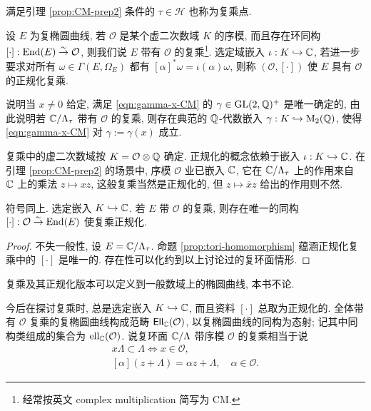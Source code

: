 满足引理 \ref{prop:CM-prep2} 条件的 $\tau \in \mathcal{H}$ 也称为复乘点. 

\begin{definition}[复乘]
	设 $E$ 为复椭圆曲线, 若 $\mathcal{O}$ 是某个虚二次数域 $K$ 的序模, 而且存在环同构 $[\cdot]: \operatorname{End}(E) \stackrel{\sim}{\rightarrow} \mathcal{O}$, 则我们说 $E$ 带有 $\mathcal{O}$ 的复乘\footnote{经常按英文 complex multiplication 简写为 CM.}. 选定域嵌入 $\iota: K \hookrightarrow \mathbb{C}$, 若进一步要求对所有 $\omega \in \Gamma(E, \Omega_E)$ 都有 $[\alpha]^* \omega = \iota(\alpha) \omega$, 则称 $(\mathcal{O}, [\cdot])$ 使 $E$ 具有 $\mathcal{O}$ 的正规化复乘.
\end{definition}

\begin{exercise}
	说明当 $x \neq 0$ 给定, 满足 \eqref{eqn:gamma-x-CM} 的 $\gamma \in \operatorname{GL}(2, \mathbb{Q})^+$ 是唯一确定的, 由此说明若 $\mathbb{C}/\Lambda_\tau$ 带有 $\mathcal{O}$ 的复乘, 则存在典范的 $\mathbb{Q}$-代数嵌入 $\gamma: K \hookrightarrow \operatorname{M}_2(\mathbb{Q})$, 使得 \eqref{eqn:gamma-x-CM} 对 $\gamma := \gamma(x)$ 成立.
\end{exercise}

复乘中的虚二次数域按 $K = \mathcal{O} \otimes \mathbb{Q}$ 确定. 正规化的概念依赖于嵌入 $\iota: K \hookrightarrow \mathbb{C}$. 在引理 \ref{prop:CM-prep2} 的场景中, 序模 $\mathcal{O}$ 业已嵌入 $\mathbb{C}$, 它在 $\mathbb{C}/\Lambda_\tau$ 上的作用来自 $\mathbb{C}$ 上的乘法 $z \mapsto xz$, 这般复乘当然是正规化的, 但 $z \mapsto \overline{x} z$ 给出的作用则不然. 

\begin{lemma}
	符号同上. 选定嵌入 $K \hookrightarrow \mathbb{C}$. 若 $E$ 带 $\mathcal{O}$ 的复乘, 则存在唯一的同构 $[\cdot]: \mathcal{O} \stackrel{\sim}{\rightarrow} \operatorname{End}(E)$ 使复乘正规化.
\end{lemma}
\begin{proof}
	不失一般性, 设 $E = \mathbb{C}/\Lambda_\tau$. 命题 \ref{prop:tori-homomorphism} 蕴涵正规化复乘中的 $[\cdot]$ 是唯一的. 存在性可以化约到以上讨论过的复环面情形.
\end{proof}

复乘及其正规化版本可以定义到一般数域上的椭圆曲线, 本书不论.

今后在探讨复乘时, 总是选定嵌入 $K \hookrightarrow \mathbb{C}$, 而且资料 $[\cdot]$ 总取为正规化的. 全体带有 $\mathcal{O}$ 复乘的复椭圆曲线构成范畴 $\mathsf{Ell}_{\mathbb{C}}(\mathcal{O})$, 以复椭圆曲线的同构为态射; 记其中同构类组成的集合为 $\mathrm{ell}_{\mathbb{C}}(\mathcal{O})$. 说复环面 $\mathbb{C}/\Lambda$ 带序模 $\mathcal{O}$ 的复乘相当于说
\begin{equation}\label{eqn:CM-lattice} \begin{gathered}
	x\Lambda \subset \Lambda \iff x \in \mathcal{O},\\
	[\alpha](z + \Lambda) = \alpha z + \Lambda, \quad \alpha \in \mathcal{O}.
\end{gathered}\end{equation}

